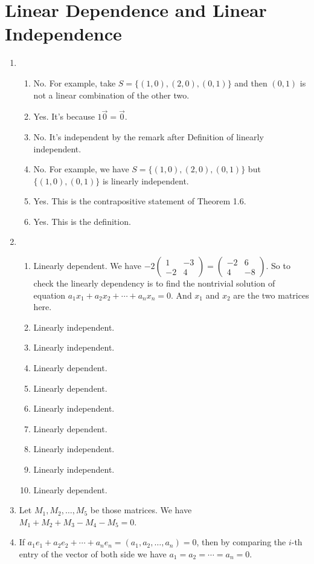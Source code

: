 \section{Linear Dependence and Linear Independence}
\begin{enumerate}
\item \begin{enumerate}
\item No. For example, take $S=\{(1,0),(2,0),(0,1)\}$ and then $(0,1)$ is not a linear combination of the other two.
\item Yes. It's because $1\vec{0}=\vec{0}$.
\item No. It's independent by the remark after Definition of linearly independent.
\item No. For example, we have $S=\{(1,0),(2,0),(0,1)\}$ but $\{(1,0),(0,1)\}$ is linearly independent.
\item Yes. This is the contrapositive statement of Theorem 1.6.
\item Yes. This is the definition.
\end{enumerate}
\item \begin{enumerate}
\item Linearly dependent. We have $-2\left( \begin{array}{cc}1&-3\\-2&4\end{array}\right) =\left( \begin{array}{cc}-2&6\\4&-8\end{array}\right)$. So to check the linearly dependency is to find the nontrivial solution of equation $a_1x_1+a_2x_2+\cdots +a_nx_n=0$. And $x_1$ and $x_2$ are the two matrices here.
\item Linearly independent.
\item Linearly independent.
\item Linearly dependent.
\item Linearly dependent.
\item Linearly independent.
\item Linearly dependent.
\item Linearly independent.
\item Linearly independent.
\item Linearly dependent.
\end{enumerate}
\item Let $M_1, M_2,\dots ,M_5$ be those matrices. We have $M_1+M_2+M_3-M_4-M_5=0$.
\item If $a_1e_1+a_2e_2+\cdots +a_ne_n=(a_1,a_2,\dots ,a_n)=0$, then by comparing the $i$-th entry of the vector of both side we have $a_1=a_2=\cdots =a_n=0$.

\end{enumerate}
